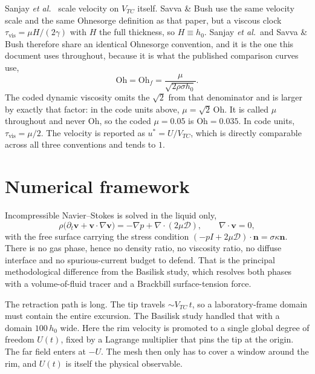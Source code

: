 \documentclass[11pt,a4paper]{article}
\newcommand{\Oh}{\mathrm{Oh}}
\newcommand{\Vtc}{V_{TC}}
\newcommand{\ustar}{u^{*}}
\begin{document}
Sanjay \textit{et al.}\ \cite{sanjay2022} scale velocity on $\Vtc$ itself.
Savva \& Bush \cite{savva2009} use the same velocity scale and the same
Ohnesorge definition as that paper, but a viscous clock
$\tau_{\mathrm{vis}} = \mu H/(2\gamma)$ with $H$ the full thickness, so
$H \equiv h_0$. Sanjay \textit{et al.}\ and Savva \& Bush therefore share an
identical Ohnesorge convention, and it is the one this document uses
throughout, because it is what the published comparison curves use,
\begin{equation}
  \Oh = \mathrm{Oh}_f = \frac{\mu}{\sqrt{2\rho\sigma h_0}}.
\end{equation}
The coded dynamic viscosity omits the $\sqrt{2}$ from that denominator and is
larger by exactly that factor: in the code units above, $\mu = \sqrt{2}\,\Oh$.
It is called $\mu$ throughout and never $\Oh$, so the coded $\mu = 0.05$ is
$\Oh = 0.035$. In code units, $\tau_{\mathrm{vis}} = \mu/2$. The velocity is reported as
$\ustar = U/\Vtc$, which is directly comparable across all three conventions
and tends to $1$.

\section{Numerical framework}
\label{sec:method}

Incompressible Navier--Stokes is solved in the liquid only,
\begin{equation}
  \rho\bigl(\partial_t\mathbf{v} + \mathbf{v}\cdot\nabla\mathbf{v}\bigr)
  = -\nabla p + \nabla\cdot(2\mu\boldsymbol{\mathcal{D}}),
  \qquad
  \nabla\cdot\mathbf{v} = 0,
\end{equation}
with the free surface carrying the stress condition
$(-p I + 2\mu\boldsymbol{\mathcal{D}})\cdot\mathbf{n} = \sigma\kappa\mathbf{n}$.
There is no gas phase, hence no density ratio, no viscosity ratio, no diffuse
interface and no spurious-current budget to defend. That is the principal
methodological difference from the Basilisk study, which resolves both phases
with a volume-of-fluid tracer and a Brackbill surface-tension force.

The retraction path is long. The tip travels $\sim\Vtc\, t$, so a
laboratory-frame domain must contain the entire excursion. The Basilisk study
handled that with a domain $100\,h_0$ wide. Here the rim velocity is promoted
to a single global degree of freedom $U(t)$, fixed by a Lagrange multiplier
that pins the tip at the origin. The far field enters at $-U$. The mesh then
only has to cover a window around the rim, and $U(t)$ is itself the physical
observable.
\end{document}
